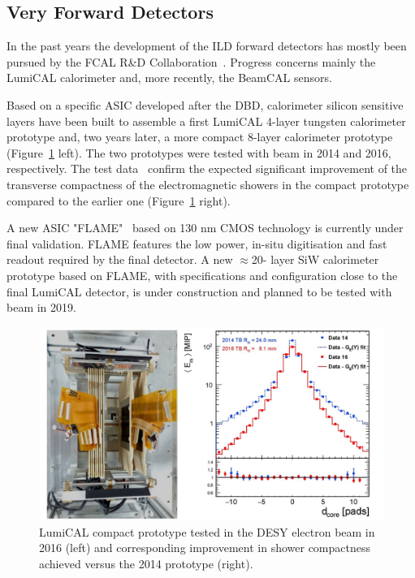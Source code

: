 \subsection{Very Forward Detectors}

In the past years the development of the ILD forward detectors has mostly been pursued by the FCAL R\&D Collaboration~\cite{ild:bib:FCAL}. Progress concerns mainly the LumiCAL calorimeter and, more recently, the BeamCAL sensors.

Based on a specific ASIC developed after the DBD, calorimeter silicon sensitive layers have been built to assemble a first LumiCAL 4-layer tungsten calorimeter prototype and, two years later, a more compact 8-layer calorimeter prototype (Figure~\ref{fig:det:LUMICAL_perf} left). The two prototypes were tested with beam in 2014 and 2016, respectively. The test data~\cite{Abramowicz:2018vwb} confirm the expected significant improvement of the transverse compactness of the electromagnetic showers in the compact prototype compared to the earlier one (Figure~\ref{fig:det:LUMICAL_perf} right). 

A new ASIC "FLAME"~\cite{ild:bib:FLAME} based on 130 nm CMOS technology is currently under final validation. FLAME features the low power, in-situ digitisation and fast readout required by the final detector. A new $\approx$20- layer SiW calorimeter prototype based on FLAME, with specifications and configuration close to the final LumiCAL detector, is under construction and planned to be tested with beam in 2019. 

\begin{figure}[t!]
\centering
\includegraphics[width=1.0\hsize]{Detector/fig/LUMICAL_perf.jpg}
\caption{LumiCAL compact prototype tested in the DESY electron beam in 2016 (left) and corresponding improvement in shower compactness achieved versus the 2014 prototype (right).}
\label{fig:det:LUMICAL_perf}
\end{figure}

